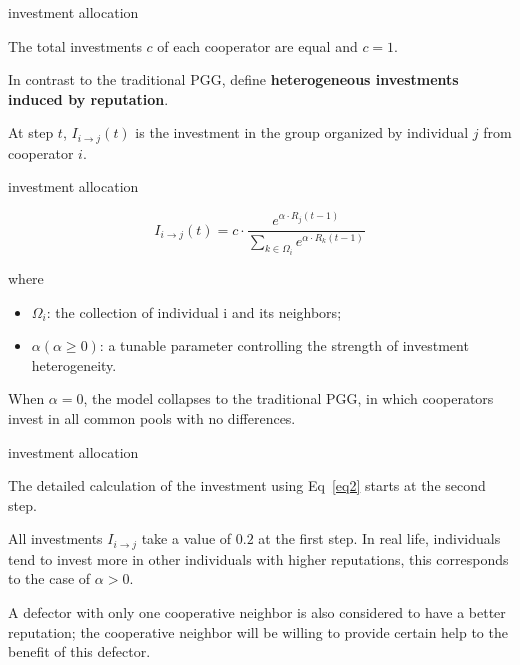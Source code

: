 \documentclass[notheorems,11pt,compress]{beamer}
\numberwithin{figure}{section}
\numberwithin{table}{section}
\numberwithin{equation}{section}
\theoremstyle{plain}
\numberwithin{theorem}{section}
\numberwithin{definition}{section}
\numberwithin{lemma}{section}
\numberwithin{proposition}{section}
\numberwithin{corollary}{section}
\theoremstyle{example}
\begin{document}

\begin{frame}{investment allocation}

	The total investments $c$ of each cooperator are equal and $c = 1$.

	In contrast to the traditional PGG, define \textbf{heterogeneous investments induced by reputation}.

	At step $t$, $I_{i\to j}(t)$ is the investment in the group organized by individual $j$ from cooperator $i$.
\end{frame}



\begin{frame}{investment allocation}

	\begin{equation}\label{eq2}
		I_{i \rightarrow j}(t)=c \cdot \frac{e^{\alpha \cdot R_j(t-1)}}{\sum_{k \in \Omega_i} e^{\alpha \cdot R_k(t-1)}}
	\end{equation}

	where
	\begin{itemize}
		\item $\Omega_i$: the collection of individual i and its neighbors;
		\item $\alpha(\alpha\geq0)$: a tunable parameter controlling the strength of investment heterogeneity.
	\end{itemize}

	When $\alpha  = 0$, the model collapses to the traditional PGG, in which cooperators invest in all common pools with no differences.
\end{frame}


\begin{frame}{investment allocation}

	The detailed calculation of the investment using Eq~\ref{eq2} starts at the second step.

	All investments $I_{i\to j}$ take a value of $0.2$ at the first step.
	In real life, individuals tend to invest more in other individuals with higher reputations, this corresponds to the case of $\alpha >0$.

	A defector with only one cooperative neighbor is also considered to have a better reputation; the cooperative neighbor will be willing to provide certain help to the benefit of this defector.
\end{frame}
\end{document}
